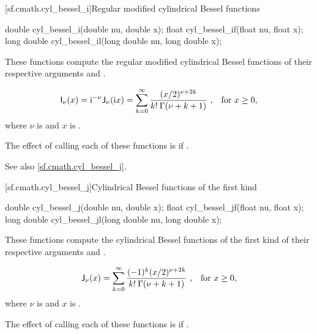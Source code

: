 [sf.cmath.cyl_bessel_i]{Regular modified cylindrical Bessel functions}%
%
%
%
%
%
\begin{itemdecl}
double       cyl_bessel_i(double nu, double x);
float        cyl_bessel_if(float nu, float x);
long double  cyl_bessel_il(long double nu, long double x);
\end{itemdecl}

\begin{itemdescr}
\pnum
\effects
These functions compute
the regular modified cylindrical Bessel functions
of their respective arguments
 and .

\pnum
\returns
\[ \mathsf{I}_\nu(x) =
     \mathrm{i}^{-\nu} \mathsf{J}_\nu(\mathrm{i}x) =
     \sum_{k=0}^\infty \frac{(x/2)^{\nu+2k}}{k! \: \Gamma(\nu+k+1)}
     \text{ ,\quad for $x \ge 0$,} \]
where
$\nu$ is  and
$x$ is .

\pnum
\remarks
The effect of calling each of these functions
is 
if .

\pnum
See also \ref{sf.cmath.cyl_bessel_j}.
\end{itemdescr}

[sf.cmath.cyl_bessel_j]{Cylindrical Bessel functions of the first kind}%
%
%
%
%
%
\begin{itemdecl}
double       cyl_bessel_j(double nu, double x);
float        cyl_bessel_jf(float nu, float x);
long double  cyl_bessel_jl(long double nu, long double x);
\end{itemdecl}

\begin{itemdescr}

\pnum\effects
These functions compute
the cylindrical Bessel functions of the first kind
of their respective arguments
 and .

\pnum\returns
\[ \mathsf{J}_\nu(x) =
   \sum_{k=0}^\infty \frac{(-1)^k (x/2)^{\nu+2k}}{k! \: \Gamma(\nu+k+1)}
   \text{ ,\quad for $x \ge 0$,} \]
where
$\nu$ is  and
$x$ is .

\pnum\remarks
The effect of calling each of these functions
is 
if .
\end{itemdescr}

